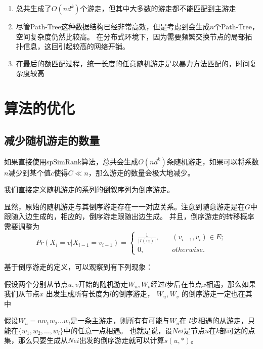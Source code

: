 \documentclass[master]{njuthesis}
\begin{document}
\begin{enumerate}

\item 总共生成了$O(nd^k)$个游走，但其中大多数的游走都不能匹配到主游走

\item 尽管Path-Tree这种数据结构已经非常高效，但是考虑到会生成$n$个Path-Tree，空间复杂度仍然比较高。
在分布式环境下，因为需要频繁交换节点的局部拓扑信息，这回引起较高的网络开销。

\item 在最后的额匹配过程，统一长度的任意随机游走是以暴力方法匹配的，时间复杂度较高

\end{enumerate}

\section{算法的优化}
\subsection{减少随机游走的数量}
如果直接使用spSimRank算法，总共会生成$O(nd^k)$条随机游走，如果可以将系数$n$减少到某个值$c$使得$C \ll n$，那么游走的数量会极大地减少。
\begin{definition}[倒叙游走]
 我们直接定义随机游走的系列的倒叙序列为倒序游走。
\end{definition}
显然，原始的随机游走与其倒序游走存在一一对应关系。注意到随意游走是在$G$中跟随入边生成的，相应的，倒序游走跟随出边生成。
并且，倒序游走的转移概率需要调整为
\begin{equation}
Pr(X_i=v|X_{i-1}=v_{i-1}) = \left\{
        \begin{array}{ll}
	\frac{1}{|I(v_{i})|}, & \quad (v_{i-1}, v_i) \in E; \\
	0,  &\quad otherwise.
        \end{array}
    \right.
	\label{eq:eight}
\end{equation}

基于倒序游走的定义，可以观察到有下列现象：
\begin{fact}
假设两个分别从节点$u, v$开始的随机游走$W_u, W_v$经过$l$步后在节点$x$相遇，那么如果我们从节点$x$ 出发生成所有长度为$l$的倒序游走，
$W_u, W_v$ 的倒序游走一定也在其中
\end{fact}
\begin{fact}
 假设$W_u=uw_1w_2\dots w_l$是一条主游走，则所有有可能与$W_u$在 $l$步相遇的从游走，只能在$\{w_1, w_2, \dots, w_l\}$中的任意一点相遇。
 也就是说，设$Nei$是节点$u$在$k$部可达的点集，那么只要生成从$Nei$出发的倒序游走就可以计算$s(u,*)$。
\end{fact}
\end{document}

